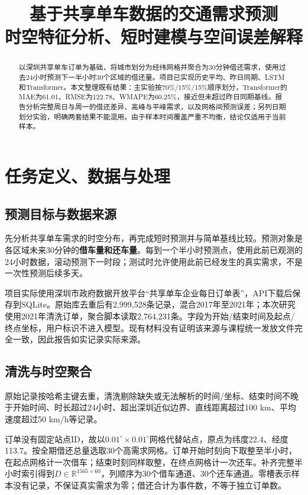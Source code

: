 \documentclass[11pt]{ctexart}
\title{基于共享单车数据的交通需求预测\\\large 时空特征分析、短时建模与空间误差解释}
\author{}\date{}
\begin{document}
\maketitle
\begin{abstract}
以深圳共享单车订单为基础，将城市划分为经纬网格并聚合为30分钟借还需求，使用过去24小时预测下一半小时30个区域的借还量。项目已实现历史平均、昨日同期、LSTM和Transformer。本文整理既有结果：主实验按70\%/15\%/15\%顺序划分，Transformer的MAE为61.01、RMSE为122.78、WMAPE为60.25\%，接近但未超过昨日同期基线。报告分析完整周日与周一的借还差异、高峰与平峰需求，以及网格间预测误差；另列日期划分实验，明确两套结果不能混用。由于样本时间覆盖严重不均衡，结论仅适用于当前样本。
\end{abstract}

\section{任务定义、数据与处理}
\subsection{预测目标与数据来源}
先分析共享单车需求的时空分布，再完成短时预测并与简单基线比较。预测对象是各区域未来30分钟的\textbf{借车量和还车量}。每到一个半小时预测点，使用此前已观测的24小时数据，滚动预测下一时段；测试时允许使用此前已经发生的真实需求，不是一次性预测后续多天。

项目实际使用深圳市政府数据开放平台“共享单车企业每日订单表”，API下载后保存到SQLite。原始库去重后有2,999,528条记录，混合2017年至2021年；本次研究使用2021年清洗订单，聚合脚本读取2,764,231条。字段为开始/结束时间及起点/终点坐标，用户标识不进入模型。现有材料没有证明该来源与课程统一发放文件完全一致，因此报告如实记录实际来源。

\subsection{清洗与时空聚合}
原始记录按哈希主键去重，清洗剔除缺失或无法解析的时间/坐标、结束时间不晚于开始时间、时长超过24小时、超出深圳近似边界、直线距离超过100 km、平均速度超过50 km/h等记录。

订单没有固定站点ID，故以$0.01^\circ\times0.01^\circ$网格代替站点，原点为纬度22.4、经度113.7。按全期借还总量选取30个高需求网格。订单开始时刻向下取整至半小时，在起点网格计一次借车；结束时刻同样取整，在终点网格计一次还车。补齐完整半小时索引得到$D\in\mathbb{R}^{1565\times60}$，列顺序为30个借车通道、30个还车通道。零槽表示样本没有记录，不保证真实需求为零；借还合计为事件数，不等于独立订单数。
\end{document}
